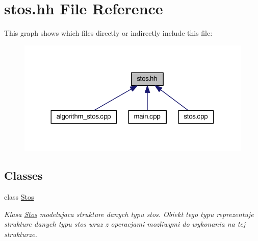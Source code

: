 \hypertarget{stos_8hh}{}\section{stos.\+hh File Reference}
\label{stos_8hh}
This graph shows which files directly or indirectly include this file\+:\nopagebreak
\begin{figure}[H]
\begin{center}
\leavevmode
\includegraphics[width=320pt]{stos_8hh__dep__incl}
\end{center}
\end{figure}
\subsection*{Classes}
\begin{DoxyCompactItemize}
\item 
class \hyperlink{class_stos}{Stos}
\begin{DoxyCompactList}\small\item\em Klasa \hyperlink{class_stos}{Stos} modelujaca strukture danych typu stos. Obiekt tego typu reprezentuje strukture danych typu stos wraz z operacjami mozliwymi do wykonania na tej strukturze. \end{DoxyCompactList}\end{DoxyCompactItemize}

